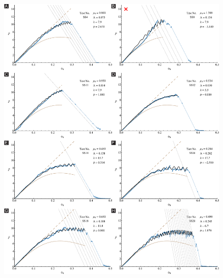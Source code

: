 \documentclass[preprint,10pt,times]{elsarticle}
\numberwithin{equation}{section}
\begin{document}
\begin{figure}
\centering{}\includegraphics[width=1\textwidth]{../Figures_Submit/Cat1Sub1.pdf}
\end{figure}
\end{document}
